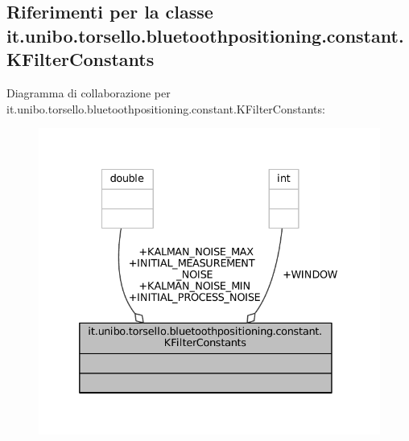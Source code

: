 \hypertarget{classit_1_1unibo_1_1torsello_1_1bluetoothpositioning_1_1constant_1_1KFilterConstants}{}\subsection{Riferimenti per la classe it.\+unibo.\+torsello.\+bluetoothpositioning.\+constant.\+K\+Filter\+Constants}
\label{classit_1_1unibo_1_1torsello_1_1bluetoothpositioning_1_1constant_1_1KFilterConstants}


Diagramma di collaborazione per it.\+unibo.\+torsello.\+bluetoothpositioning.\+constant.\+K\+Filter\+Constants\+:
\nopagebreak
\begin{figure}[H]
\begin{center}
\leavevmode
\includegraphics[width=332pt]{classit_1_1unibo_1_1torsello_1_1bluetoothpositioning_1_1constant_1_1KFilterConstants__coll__graph}
\end{center}
\end{figure}
